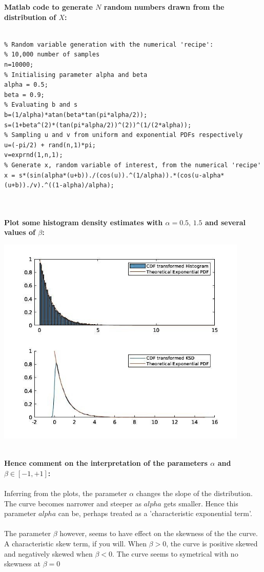 \documentclass[12pt]{article}
\begin{document}
{\bf Matlab code to generate $N$ random numbers drawn from the distribution of $X$:}
\\\\
\begin{lrbox}{\myv}\begin{minipage}{\textwidth}
\begin{verbatim}
% Random variable generation with the numerical 'recipe':
% 10,000 number of samples
n=10000;
% Initialising parameter alpha and beta
alpha = 0.5;
beta = 0.9;
% Evaluating b and s
b=(1/alpha)*atan(beta*tan(pi*alpha/2));
s=(1+beta^(2)*(tan(pi*alpha/2))^(2))^(1/(2*alpha));
% Sampling u and v from uniform and exponential PDFs respectively
u=(-pi/2) + rand(n,1)*pi;
v=exprnd(1,n,1);
% Generate x, random variable of interest, from the numerical 'recipe'
x = s*(sin(alpha*(u+b))./(cos(u)).^(1/alpha)).*(cos(u-alpha*(u+b))./v).^((1-alpha)/alpha);
\end{verbatim}
\end{minipage}\end{lrbox}
\resizebox{0.95\textwidth}{!}{\usebox\myv}
\\\\
{\bf Plot some histogram density estimates with $\alpha=0.5,\,1.5$ and several values of $\beta$:}
\begin{center}
\includegraphics[width=0.9\textwidth]{cdf-method-exp.jpg}
\end{center}
\\
\pagebreak
{\bf Hence comment on the interpretation of the parameters $\alpha$ and $\beta\in[-1,+1]$:}
\\\\
{\textsf
Inferring from the plots, the parameter $\alpha$ changes the slope of the distribution. The curve becomes narrower and steeper as $alpha$ gets smaller. Hence this parameter $alpha$ can be, perhaps treated as a 'characteristic exponential term'.\\\\
The parameter $\beta$ however, seems to have effect on the skewness of the the curve. A characteristic skew term, if you will. When $\beta >0$, the curve is positive skewed and negatively skewed when $\beta <0$. The curve seems to symetrical  with no skewness at $\beta =0$
}
\end{document}
